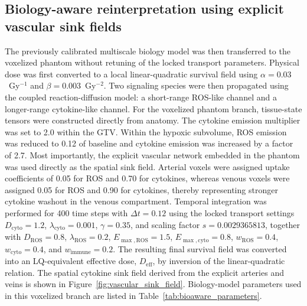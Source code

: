 \subsection{Biology-aware reinterpretation using explicit vascular sink fields}
The previously calibrated multiscale biology model was then transferred to the voxelized phantom without retuning of the locked transport parameters. Physical dose was first converted to a local linear-quadratic survival field using $\alpha=0.03$~Gy$^{-1}$ and $\beta=0.003$~Gy$^{-2}$. Two signaling species were then propagated using the coupled reaction-diffusion model: a short-range ROS-like channel and a longer-range cytokine-like channel. For the voxelized phantom branch, tissue-state tensors were constructed directly from anatomy. The cytokine emission multiplier was set to 2.0 within the GTV. Within the hypoxic subvolume, ROS emission was reduced to 0.12 of baseline and cytokine emission was increased by a factor of 2.7. Most importantly, the explicit vascular network embedded in the phantom was used directly as the spatial sink field. Arterial voxels were assigned uptake coefficients of 0.05 for ROS and 0.70 for cytokines, whereas venous voxels were assigned 0.05 for ROS and 0.90 for cytokines, thereby representing stronger cytokine washout in the venous compartment. Temporal integration was performed for 400 time steps with $\Delta t = 0.12$ using the locked transport settings $D_{\mathrm{cyto}} = 1.2$, $\lambda_{\mathrm{cyto}} = 0.001$, $\gamma = 0.35$, and scaling factor $s = 0.0029365813$, together with $D_{\mathrm{ROS}} = 0.8$, $\lambda_{\mathrm{ROS}} = 0.2$, $E_{\max,\mathrm{ROS}} = 1.5$, $E_{\max,\mathrm{cyto}} = 0.8$, $w_{\mathrm{ROS}} = 0.4$, $w_{\mathrm{cyto}} = 0.4$, and $w_{\mathrm{immune}} = 0.2$. The resulting final survival field was converted into an LQ-equivalent effective dose, $D_{\mathrm{eff}}$, by inversion of the linear-quadratic relation. The spatial cytokine sink field derived from the explicit arteries and veins is shown in Figure~\ref{fig:vascular_sink_field}. Biology-model parameters used in this voxelized branch are listed in Table~\ref{tab:bioaware_parameters}.


